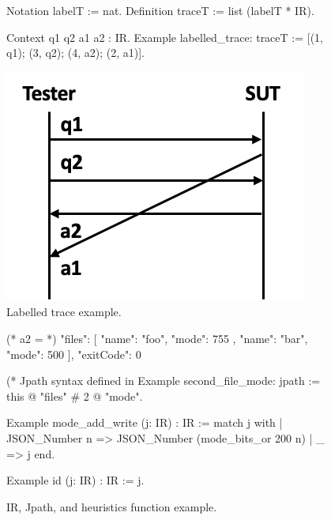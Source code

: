 \begin{figure}
\begin{minipage}{.6\textwidth}
\begin{coq}
Notation   labelT := nat.
Definition traceT := list (labelT * IR).

Context q1 q2 a1 a2 : IR.
Example labelled_trace: traceT :=
  [(1, q1); (3, q2); (4, a2); (2, a1)].
\end{coq}
\end{minipage}\begin{minipage}{.3\textwidth}
  \includegraphics[width=\linewidth]{figures/ir-trace}
\end{minipage}
\caption{Labelled trace example.}
\label{fig:ir-trace}
\end{figure}

\begin{figure}
  \begin{minipage}[t]{.4\textwidth}
\begin{json}
  (* a2 = *)
  {
    "files": [
      {
        "name": "foo",
        "mode": 755
      },
      {
        "name": "bar",
        "mode": 500
      }
    ],
    "exitCode": 0
  }
\end{json}
  \end{minipage}\begin{minipage}[t]{.5\textwidth}
\begin{coq}
(* Jpath syntax defined in %
Example second_file_mode: jpath :=
  this @ "files" # 2 @ "mode".

Example mode_add_write (j: IR) : IR :=
  match j with
  | JSON_Number n =>
    JSON_Number (mode_bits_or 200 n)
  | _ => j
  end.

Example id (j: IR) : IR := j.
\end{coq}
  \end{minipage}
\vspace*{1em}
  \caption{IR, Jpath, and heuristics function example.}
  \label{fig:ir-jpath}
\end{figure}

